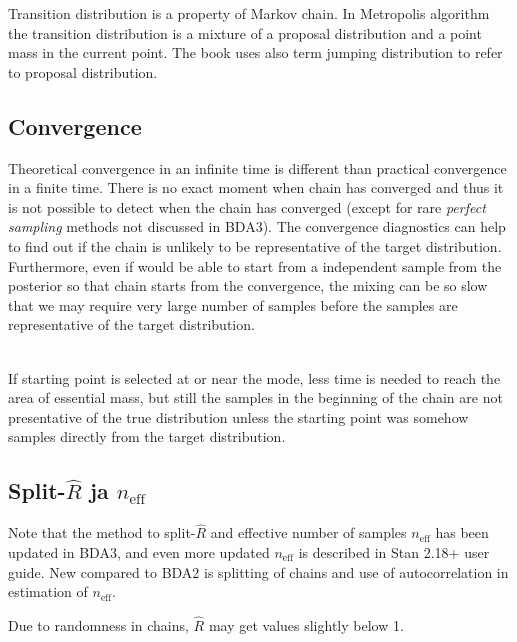 \documentclass[a4paper,11pt,english]{article}
\def\eff{\mathrm{eff}}
\begin{document}
Transition distribution is a property of Markov chain. In Metropolis
algorithm the transition distribution is a mixture of a proposal
distribution and a point mass in the current point. The book uses also
term jumping distribution to refer to proposal distribution.

\subsection*{Convergence}

Theoretical convergence in an infinite time is different than
practical convergence in a finite time. There is no exact moment when
chain has converged and thus it is not possible to detect when the
chain has converged (except for rare \emph{perfect sampling} methods
not discussed in BDA3). The convergence diagnostics can help to find
out if the chain is unlikely to be representative of the target
distribution. Furthermore, even if would be able to start from a
independent sample from the posterior so that chain starts from the
convergence, the mixing can be so slow that we may require very large
number of samples before the samples are representative of the target
distribution.

~\\
If starting point is selected at or near the mode, less time is needed
to reach the area of essential mass, but still the samples in the
beginning of the chain are not presentative of the true distribution
unless the starting point was somehow samples directly from the target
distribution. 

\subsection*{Split-$\hat{R}$ ja $n_\eff$}

Note that the method to split-$\hat{R}$ and effective number of
samples $n_\eff$ has been updated in BDA3, and even more updated
$n_\eff$ is described in Stan 2.18+ user guide. New compared to BDA2
is splitting of chains and use of autocorrelation in estimation of
$n_\eff$.

Due to randomness in chains, $\hat{R}$ may get values slightly below 1.
\end{document}

